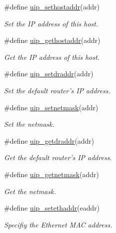 \begin{CompactItemize}
\item 
\#define \hyperlink{a00061_g12b467f314489259dd718228d0827a51}{uip\_\-sethostaddr}(addr)
\begin{CompactList}\small\item\em Set the IP address of this host. \item\end{CompactList}\item 
\#define \hyperlink{a00061_g20bc87e5c063c3f4b01547be6e5a0148}{uip\_\-gethostaddr}(addr)
\begin{CompactList}\small\item\em Get the IP address of this host. \item\end{CompactList}\item 
\#define \hyperlink{a00061_g41d37ea1e3bd24f7b51e9409aceaaa80}{uip\_\-setdraddr}(addr)
\begin{CompactList}\small\item\em Set the default router's IP address. \item\end{CompactList}\item 
\#define \hyperlink{a00061_geb79c914cf137e6d27fd7583e5a66679}{uip\_\-setnetmask}(addr)
\begin{CompactList}\small\item\em Set the netmask. \item\end{CompactList}\item 
\#define \hyperlink{a00061_gd8e8bc9bc0e2ea4a24a8a024fd3a7f7c}{uip\_\-getdraddr}(addr)
\begin{CompactList}\small\item\em Get the default router's IP address. \item\end{CompactList}\item 
\#define \hyperlink{a00061_g5323320b7316647042016f17c4e881be}{uip\_\-getnetmask}(addr)
\begin{CompactList}\small\item\em Get the netmask. \item\end{CompactList}\item 
\#define \hyperlink{a00061_g30e827f33eacff55ecb4d8fb5a11d5d1}{uip\_\-setethaddr}(eaddr)
\begin{CompactList}\small\item\em Specifiy the Ethernet MAC address. \item\end{CompactList}\end{CompactItemize}


